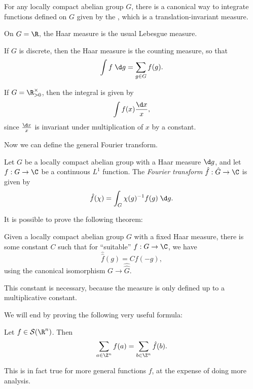 \documentclass[a4paper]{article}
\begin{document}
For any locally compact abelian group $G$, there is a canonical way to integrate functions defined on $G$ given by the , which is a translation-invariant measure.

\begin{eg}
  On $G = \R$, the Haar measure is the usual Lebesgue measure.
\end{eg}

\begin{eg}
  If $G$ is discrete, then the Haar measure is the counting measure, so that
  \[
    \int f\;\d g = \sum_{g \in G} f(g).
  \]
\end{eg}

\begin{eg}
  If $G = \R_{> 0}^\times$, then the integral is given by
  \[
    \int f(x) \frac{\d x}{x},
  \]
  since $\frac{\d x}{x}$ is invariant under multiplication of $x$ by a constant.
\end{eg}

Now we can define the general Fourier transform.
\begin{defi}
  Let $G$ be a locally compact abelian group with a Haar measure $\d g$, and let $f: G \to \C$ be a continuous $L^1$ function. The \emph{Fourier transform} $\hat{f}: \hat{G} \to \C$ is given by
  \[
    \hat{f}(\chi) = \int_G \chi(g)^{-1}f(g) \;\d g.
  \]
\end{defi}

It is possible to prove the following theorem:
\begin{thm}
 Given a locally compact abelian group $G$ with a fixed Haar measure, there is some constant $C$ such that for ``suitable'' $f: G \to \C$, we have
 \[
   \hat{\hat{f}}(g) = C f(-g),
 \]
 using the canonical isomorphism $G \to \hat{\hat{G}}$.
\end{thm}
This constant is necessary, because the measure is only defined up to a multiplicative constant.

We will end by proving the following very useful formula:
\begin{thm}
  Let $f \in \mathcal{S}(\R^n)$. Then
  \[
    \sum_{a \in \Z^n} f(a) = \sum_{b \in \Z^n} \hat{f}(b).
  \]
\end{thm}
This is in fact true for more general functions $f$, at the expense of doing more analysis.
\end{document}

